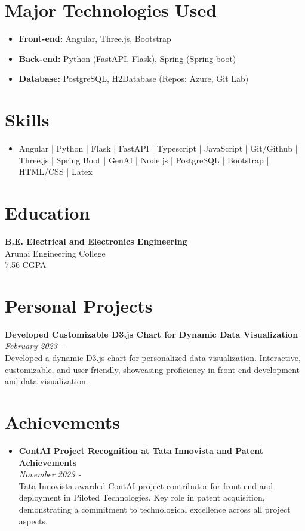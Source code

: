 \documentclass[letterpaper,10pt]{article}
\begin{document}
\begin{multicols}{2}
\section*{\textcolor{headercolor}{Major Technologies Used}}
\begin{itemize}
    \item \textbf{Front-end:} Angular, Three.js, Bootstrap
    \item \textbf{Back-end:} Python (FastAPI, Flask), Spring (Spring boot)
    \item \textbf{Database:} PostgreSQL, H2Database (Repos: Azure, Git Lab)
\end{itemize}

\section*{\textcolor{headercolor}{Skills}}
\begin{itemize}
    \item Angular | Python | Flask | FastAPI | Typescript | JavaScript | Git/Github | Three.js | Spring Boot | GenAI | Node.js | PostgreSQL | Bootstrap | HTML/CSS | Latex
\end{itemize}

\section*{\textcolor{headercolor}{Education}}
\textbf{B.E. Electrical and Electronics Engineering} \\
Arunai Engineering College \\
7.56 CGPA

\section*{\textcolor{headercolor}{Personal Projects}}
\textbf{Developed Customizable D3.js Chart for Dynamic Data Visualization} \\
\textit{February 2023 -} \\
Developed a dynamic D3.js chart for personalized data visualization. Interactive, customizable, and user-friendly, showcasing proficiency in front-end development and data visualization.

\section*{\textcolor{headercolor}{Achievements}}
\begin{itemize}
    \item \textbf{ContAI Project Recognition at Tata Innovista and Patent Achievements} \\
    \textit{November 2023 -} \\
    Tata Innovista awarded ContAI project contributor for front-end and deployment in Piloted Technologies. Key role in patent acquisition, demonstrating a commitment to technological excellence across all project aspects.
    

\end{itemize}
\end{multicols}
\end{document}
